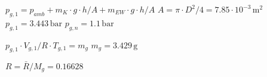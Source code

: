 \( p_{g,1} = p_{amb} + m_{K} \cdot g \cdot h / A + m_{EW} \cdot g \cdot h / A \)  
\( A = \pi \cdot D^2 / 4 = 7.85 \cdot 10^{-3} \, \text{m}^2 \)  
\( p_{g,1} = 3.443 \, \text{bar} \)  
\( p_{g,n} = 1.1 \, \text{bar} \)  

\( p_{g,1} \cdot V_{g,1} / R \cdot T_{g,1} = m_{g} \)  
\( m_{g} = 3.429 \, \text{g} \)  

\( R = \bar{R} / M_{g} = 0.16628 \)